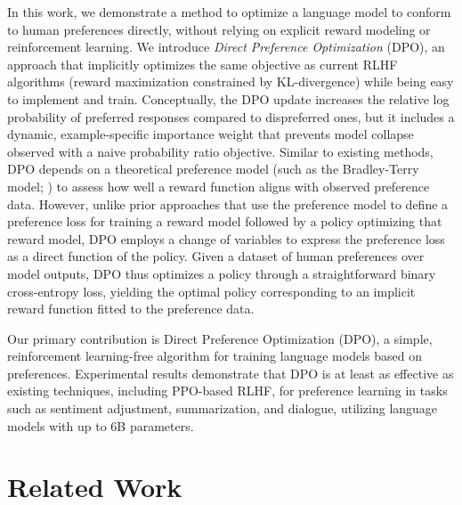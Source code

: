 In this work, we demonstrate a method to optimize a language model to conform to human preferences directly, without relying on explicit reward modeling or reinforcement learning. We introduce \textit{Direct Preference Optimization} (DPO), an approach that implicitly optimizes the same objective as current RLHF algorithms (reward maximization constrained by KL-divergence) while being easy to implement and train. Conceptually, the DPO update increases the relative log probability of preferred responses compared to dispreferred ones, but it includes a dynamic, example-specific importance weight that prevents model collapse observed with a naive probability ratio objective. Similar to existing methods, DPO depends on a theoretical preference model (such as the Bradley-Terry model; \cite{bradley1952rankanalysis}) to assess how well a reward function aligns with observed preference data. However, unlike prior approaches that use the preference model to define a preference loss for training a reward model followed by a policy optimizing that reward model, DPO employs a change of variables to express the preference loss as a direct function of the policy. Given a dataset of human preferences over model outputs, DPO thus optimizes a policy through a straightforward binary cross-entropy loss, yielding the optimal policy corresponding to an implicit reward function fitted to the preference data.

Our primary contribution is Direct Preference Optimization (DPO), a simple, reinforcement learning-free algorithm for training language models based on preferences. Experimental results demonstrate that DPO is at least as effective as existing techniques, including PPO-based RLHF, for preference learning in tasks such as sentiment adjustment, summarization, and dialogue, utilizing language models with up to 6B parameters.

\section{Related Work}

